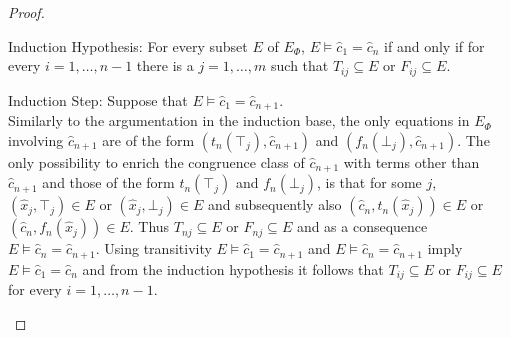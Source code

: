 \begin{proof}
\begin{paragraph}{Induction Hypothesis:} For every subset $E$ of $E_{\Phi}$, $E \models \hat{c}_1 = \hat{c}_{n}$ if and only if for every $i = 1,\ldots,n-1$ there is a $j = 1,\ldots,m$ such that $T_{ij} \subseteq E$ or $F_{ij} \subseteq E$.
\end{paragraph}

\begin{paragraph}{Induction Step:}
Suppose that $E \models \hat{c}_1 = \hat{c}_{n+1}$.\\
Similarly to the argumentation in the induction base, the only equations in $E_{\Phi}$ involving $\hat{c}_{n+1}$ are of the form $(t_n(\top_j),\hat{c}_{n+1})$ and $(f_n(\bot_j),\hat{c}_{n+1})$.
The only possibility to enrich the congruence class of $\hat{c}_{n+1}$ with terms other than $\hat{c}_{n+1}$ and those of the form $t_n(\top_j)$ and $f_n(\bot_j)$, 
is that for some $j$, $(\hat{x}_j,\top_j) \in E$ or $(\hat{x}_j,\bot_j) \in E$ and subsequently also $(\hat{c}_n,t_n(\hat{x}_j)) \in E$ or $(\hat{c}_n,f_n(\hat{x}_j)) \in E$.
Thus $T_{nj} \subseteq E$ or $F_{nj} \subseteq E$ and as a consequence $E \models \hat{c}_n = \hat{c}_{n+1}$.
Using transitivity $E \models \hat{c}_1 = \hat{c}_{n+1}$ and $E \models \hat{c}_n = \hat{c}_{n+1}$ imply $E \models \hat{c}_1 = \hat{c}_n$ and from the induction hypothesis it follows that  $T_{ij} \subseteq E$ or $F_{ij} \subseteq E$ for every $i = 1,\ldots,n-1$.
\end{paragraph}

\end{proof}

